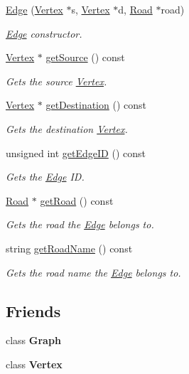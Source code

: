 \begin{DoxyCompactItemize}
\item 
\hyperlink{class_edge_a6f3e5890f75a60b8ef4f184a732b0902}{Edge} (\hyperlink{class_vertex}{Vertex} $\ast$s, \hyperlink{class_vertex}{Vertex} $\ast$d, \hyperlink{class_road}{Road} $\ast$road)
\begin{DoxyCompactList}\small\item\em \hyperlink{class_edge}{Edge} constructor. \end{DoxyCompactList}\item 
\hyperlink{class_vertex}{Vertex} $\ast$ \hyperlink{class_edge_a81d05b230991af82d5413a80ada767e3}{get\+Source} () const 
\begin{DoxyCompactList}\small\item\em Gets the source \hyperlink{class_vertex}{Vertex}. \end{DoxyCompactList}\item 
\hyperlink{class_vertex}{Vertex} $\ast$ \hyperlink{class_edge_aceb8cb1946f591c08447cad8fdb2f74c}{get\+Destination} () const 
\begin{DoxyCompactList}\small\item\em Gets the destination \hyperlink{class_vertex}{Vertex}. \end{DoxyCompactList}\item 
unsigned int \hyperlink{class_edge_aeab37304f58ea52a6a56ab8c67e19e04}{get\+Edge\+ID} () const 
\begin{DoxyCompactList}\small\item\em Gets the \hyperlink{class_edge}{Edge} ID. \end{DoxyCompactList}\item 
\hyperlink{class_road}{Road} $\ast$ \hyperlink{class_edge_ae6d5104814cd5626346943b58d3ae30a}{get\+Road} () const 
\begin{DoxyCompactList}\small\item\em Gets the road the \hyperlink{class_edge}{Edge} belongs to. \end{DoxyCompactList}\item 
string \hyperlink{class_edge_ad0fd8905a0c065cf288e95211edc731b}{get\+Road\+Name} () const 
\begin{DoxyCompactList}\small\item\em Gets the road name the \hyperlink{class_edge}{Edge} belongs to. \end{DoxyCompactList}\end{DoxyCompactItemize}
\subsection*{Friends}
\begin{DoxyCompactItemize}
\item 
class {\bfseries Graph}\hypertarget{class_edge_afab89afd724f1b07b1aaad6bdc61c47a}{}\label{class_edge_afab89afd724f1b07b1aaad6bdc61c47a}

\item 
class {\bfseries Vertex}\hypertarget{class_edge_a1251d18f08324022e8e73506c3768f3c}{}\label{class_edge_a1251d18f08324022e8e73506c3768f3c}

\end{DoxyCompactItemize}


